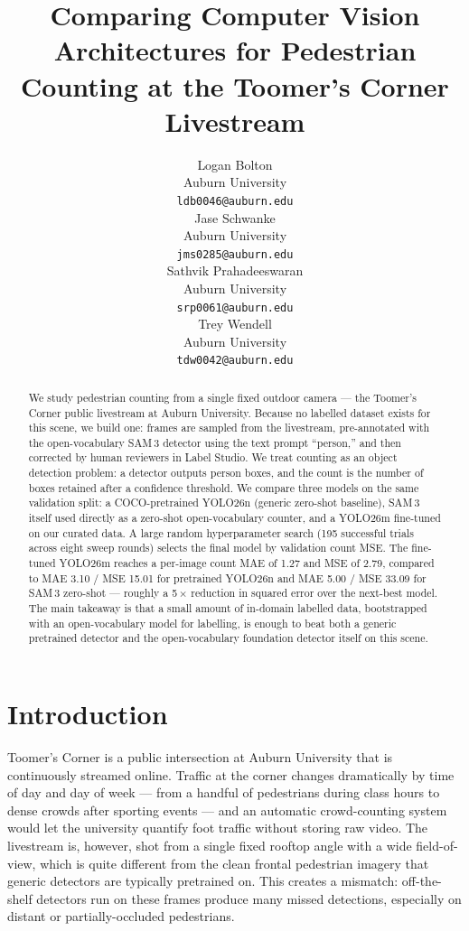 \documentclass{article}
\title{Comparing Computer Vision Architectures for Pedestrian Counting at the Toomer's Corner Livestream}
\author{%
  Logan Bolton \\
  Auburn University \\
  \texttt{ldb0046@auburn.edu} \\
  \And
  Jase Schwanke \\
  Auburn University \\
  \texttt{jms0285@auburn.edu} \\
  \And
  Sathvik Prahadeeswaran \\
  Auburn University \\
  \texttt{srp0061@auburn.edu} \\
  \And
  Trey Wendell \\
  Auburn University \\
  \texttt{tdw0042@auburn.edu} \\
}
\begin{document}
\maketitle

\begin{abstract}
We study pedestrian counting from a single fixed outdoor camera — the
Toomer's Corner public livestream at Auburn University. Because no
labelled dataset exists for this scene, we build one: frames are
sampled from the livestream, pre-annotated with the open-vocabulary
SAM\,3 detector using the text prompt ``person,'' and then corrected
by human reviewers in Label Studio. We treat counting as an object
detection problem: a detector outputs person boxes, and the count
is the number of boxes retained after a confidence threshold. We
compare three models on the same validation split: a
COCO-pretrained YOLO26n (generic zero-shot baseline), SAM\,3 itself
used directly as a zero-shot open-vocabulary counter, and a
YOLO26m fine-tuned on our curated data. A large random
hyperparameter search (195 successful trials across eight sweep
rounds) selects the final model by validation count MSE. The
fine-tuned YOLO26m reaches a per-image count MAE of 1.27 and MSE of
2.79, compared to MAE 3.10 / MSE 15.01 for pretrained YOLO26n and
MAE 5.00 / MSE 33.09 for SAM\,3 zero-shot --- roughly a
5\,$\times$ reduction in squared error over the next-best model.
The main takeaway is that a small amount of in-domain labelled
data, bootstrapped with an open-vocabulary model for labelling, is
enough to beat both a generic pretrained detector and the
open-vocabulary foundation detector itself on this scene.
\end{abstract}

\section{Introduction}
Toomer's Corner is a public intersection at Auburn University that is
continuously streamed online. Traffic at the corner changes
dramatically by time of day and day of week --- from a handful of
pedestrians during class hours to dense crowds after sporting events
--- and an automatic crowd-counting system would let the university
quantify foot traffic without storing raw video. The livestream is,
however, shot from a single fixed rooftop angle with a wide
field-of-view, which is quite different from the clean frontal
pedestrian imagery that generic detectors are typically pretrained
on. This creates a mismatch: off-the-shelf detectors run on these
frames produce many missed detections, especially on distant or
partially-occluded pedestrians.
\end{document}
